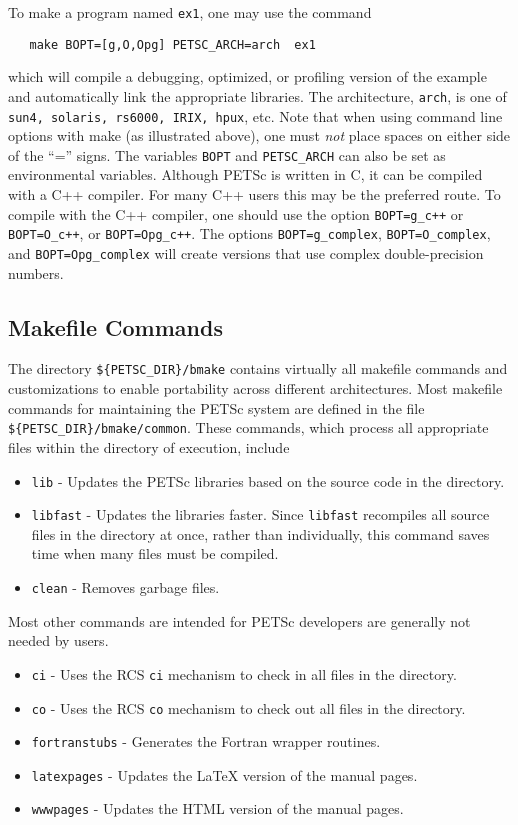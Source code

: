 {To make a program named {\tt ex1}, one may use the command
\begin{verbatim}
   make BOPT=[g,O,Opg] PETSC_ARCH=arch  ex1
\end{verbatim}
which will compile a debugging, optimized, or profiling version
of the example and automatically link the appropriate libraries.  The
architecture, {\tt arch}, is one of {\tt sun4, solaris, rs6000, IRIX,
hpux}, etc. Note
that when using command line options with make (as illustrated above),
one must {\em not} place spaces on either side of the ``='' signs.
The variables {\tt BOPT} and 
{\tt PETSC\_ARCH} can also be set as environmental
variables.  Although PETSc is written in C, it can be compiled with a 
C++ compiler.  For many C++ users this may be the preferred route. To compile
with the C++ compiler, one should use the option {\tt BOPT=g\_c++} or 
{\tt BOPT=O\_c++}, or {\tt BOPT=Opg\_c++}.  
The options {\tt BOPT=g\_complex}, {\tt BOPT=O\_complex}, and
{\tt BOPT=Opg\_complex} will
create versions that use complex double-precision numbers. 

\subsection{Makefile Commands} \label{sec:common}

The directory {\tt \$\{PETSC\_DIR\}/bmake} contains virtually all
makefile commands and customizations to enable portability across
different architectures.  Most makefile commands for maintaining the
PETSc system are defined in the file {\tt \$\{PETSC\_DIR\}/bmake/common}.  
These commands, which process all appropriate files within the
directory of execution, include
\begin{itemize}
\item {\tt lib} - Updates the PETSc libraries based on the source code
      in the directory.
\item {\tt libfast} - Updates the libraries faster.  Since
      {\tt libfast} recompiles all source files in the directory at once,
      rather than individually, this command saves time when many files
      must be compiled.
\item {\tt clean} - Removes garbage files.
\end{itemize}
\noindent Most other commands are intended for PETSc developers are generally
not needed by users.
\begin{itemize}
\item {\tt ci} - Uses the RCS {\tt ci} mechanism to check in all files in the
      directory. 
\item {\tt co} - Uses the RCS {\tt co} mechanism to check out 
      all files in the directory. 
\item {\tt fortranstubs} - Generates the Fortran wrapper routines.  
\item {\tt latexpages} - Updates the LaTeX version of the manual pages.
\item {\tt wwwpages} - Updates the HTML version of the manual pages.
\end{itemize}

}
